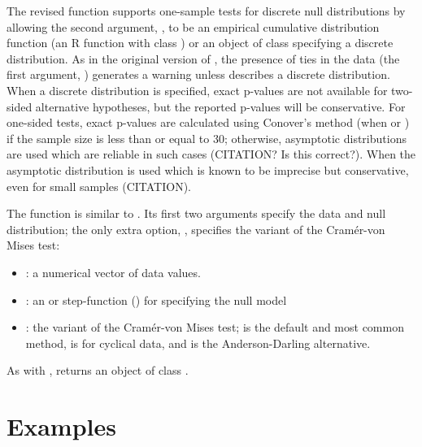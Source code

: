 The revised  function supports one-sample tests for discrete
null distributions by allowing the second argument, , to be
an empirical cumulative distribution function (an R function
with class ) or an object of class  specifying
a discrete distribution.  As in the original version of ,
the presence of ties in the data (the first argument, ) generates a
warning unless  describes a discrete distribution.  When a discrete
distribution is specified, exact p-values are not available for 
two-sided alternative hypotheses, but the reported p-values will be
conservative.  For one-sided tests,
exact p-values are calculated using Conover's
method (when  or )
if the sample size is less than or equal to 30; otherwise, asymptotic distributions
are used which are reliable in such cases (CITATION? Is this correct?).
When  the asymptotic distribution is used which is known
to be imprecise but conservative, even for small samples (CITATION).


The function  is similar to .  Its first two
arguments specify the data and null distribution; the only extra option,
, specifies the variant of the Cram\'{e}r-von Mises test:
\begin{itemize}
\item {}: a numerical vector of data values.
\item {}: an  or step-function () for specifying
the null model
\item {}: the variant of the Cram\'{e}r-von Mises test; 
is the default and most common method,  is for cyclical data,
and  is the Anderson-Darling alternative.
\end{itemize}
As with ,  returns an object of class 
.

 
\section{Examples}

